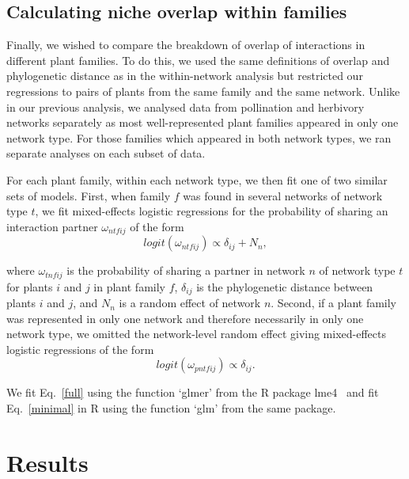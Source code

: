 \documentclass[12pt]{article}
\begin{document}
\begin{spacing}{1.5}
\subsection*{Calculating niche overlap within families}

  Finally, we wished to compare the breakdown of overlap of interactions in
  different plant families. To do this, we used the same definitions of overlap
  and phylogenetic distance as in the within-network analysis but restricted
  our regressions to pairs of plants from the same family and the same network.
  Unlike in our previous analysis, we analysed data from pollination and
  herbivory networks separately as most well-represented plant families appeared
  in only one network type. For those families which appeared in both network types, 
  we ran separate analyses on each subset of data.


  For each plant family, within each network type, we then fit one of two similar 
  sets of models. First, when family $f$ was found in several networks of network
  type $t$, we fit mixed-effects logistic regressions for the probability of sharing an interaction partner $\omega_{ntfij}$ of the form
  \begin{equation}
    logit(\omega_{ntfij}) \propto \delta_{ij} + N_{n} ,
    \label{full}
  \end{equation}

  \noindent where $\omega_{tnfij}$ is the probability of sharing a partner 
  in network $n$ of network type $t$ for plants $i$ and $j$ in plant family $f$,
  $\delta_{ij}$ is the phylogenetic distance between plants $i$ and $j$, and
  $N_{n}$ is a random effect of network $n$.
  Second, if a plant family was represented in only one network 
  and therefore necessarily in only one network type, we omitted the 
  network-level random effect giving mixed-effects logistic regressions of the form
 \begin{equation}
    logit(\omega_{pntfij}) \propto \delta_{ij} .
    \label{minimal}
  \end{equation}

  \noindent We fit Eq.~\ref{full} using the function `glmer' from the
  R package lme4~\citep{lme4} and fit Eq.~\ref{minimal} in R using the
  function `glm' from the same package.


\section*{Results}



\end{spacing}
\end{document}
